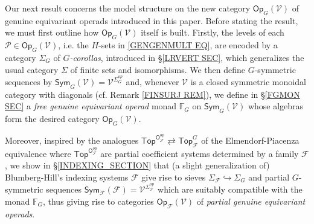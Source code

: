 \documentclass[a4paper,10pt
,draft
]{article}%
\numberwithin{equation}{section}
\numberwithin{figure}{section}
\theoremstyle{definition} %
\newcommand{\Sym}{\ensuremath{\mathsf{Sym}}}%
\newcommand{\V}{\ensuremath{\mathcal V}}
\newcommand{\1}{\ensuremath{\mathbbm 1}}%
\begin{document}

Our next result concerns the model structure
on the new category 
$\mathsf{Op}_G (\mathcal{V})$ of genuine equivariant operads
introduced in this paper. Before stating the result, we must first outline how 
$\mathsf{Op}_G (\mathcal{V})$
itself is built.
Firstly, the levels of each 
$\mathcal{P} \in \mathsf{Op}_G(\mathcal{V})$,
i.e. the $H$-sets in \eqref{GENGENMULT EQ},
are encoded by a category $\Sigma_G$ of 
\textit{$G$-corollas}, introduced in \S \ref{LRVERT SEC},
which generalizes the usual category 
$\Sigma$ of finite sets and isomorphisms.
We then define $G$-symmetric sequences by
$\mathsf{Sym}_G(\mathcal{V})=
\mathcal{V}^{\Sigma_G^{op}}$
\index{categories!SymG@$\Sym_G(\mathcal V) = \V^{\Sigma_G^{op}}$}
and,
whenever $\mathcal{V}$ is a closed symmetric monoidal category with diagonals 
(cf. Remark \ref{FINSURJ REM}),
we define in \S \ref{FGMON SEC}
a \textit{free genuine equivariant operad} monad 
$\mathbb{F}_G$ on
$\mathsf{Sym}_G(\mathcal{V})$
whose algebras form the desired category 
$\mathsf{Op}_G(\mathcal{V})$.

Moreover, inspired by the analogues
$\mathsf{Top}^{\mathsf{O}_{\mathcal{F}}^{op}}
	\rightleftarrows 
\mathsf{Top}^G_{\mathcal{F}}$
of the Elmendorf-Piacenza equivalence
where 
$\mathsf{Top}^{\mathsf{O}_{\mathcal{F}}^{op}}$
are partial coefficient systems determined by a family $\mathcal{F}$, 
we show in \S \ref{INDEXING_SECTION}
that (a slight generalization of)
Blumberg-Hill's indexing systems $\mathcal{F}$
give rise to sieves 
$\Sigma_{\mathcal{F}} \hookrightarrow \Sigma_G$
and partial $G$-symmetric sequences
$\mathsf{Sym_{\mathcal{F}}}(\mathcal{F})
=
\mathcal{V}^{\Sigma_{\mathcal{F}}^{op}}$ which are suitably compatible with the monad
$\mathbb{F}_G$,
thus giving rise to categories
$\mathsf{Op}_{\mathcal{F}}(\mathcal{V})$
of \textit{partial genuine equivariant operads}.
\end{document}
